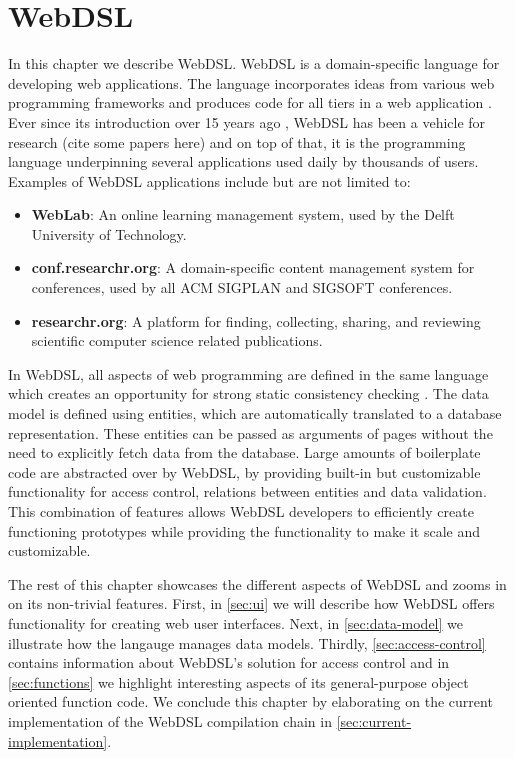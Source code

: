 
\chapter{\label{chap:webdsl}WebDSL}

  In this chapter we describe WebDSL. WebDSL is a domain-specific language for developing web applications. The language incorporates ideas from various web programming frameworks and produces code for all tiers in a web application \autocite{Groenewegen2020}. Ever since its introduction over 15 years ago \autocite{Visser2007}, WebDSL has been a vehicle for research (cite some papers here) and on top of that, it is the programming language underpinning several applications used daily by thousands of users. Examples of WebDSL applications include but are not limited to:

  \begin{itemize}
    \item \textbf{WebLab}: An online learning management system, used by the Delft University of Technology.
    \item \textbf{conf.researchr.org}: A domain-specific content management system for conferences, used by all ACM SIGPLAN and SIGSOFT conferences.
    \item \textbf{researchr.org}: A platform for finding, collecting, sharing, and reviewing scientific computer science related publications.
  \end{itemize}

  In WebDSL, all aspects of web programming are defined in the same language which creates an opportunity for strong static consistency checking \autocite{Hemel2011}. The data model is defined using entities, which are automatically translated to a database representation. These entities can be passed as arguments of pages without the need to explicitly fetch data from the database. Large amounts of boilerplate code are abstracted over by WebDSL, by providing built-in but customizable functionality for access control, relations between entities and data validation. This combination of features allows WebDSL developers to efficiently create functioning prototypes while providing the functionality to make it scale and customizable.

  The rest of this chapter showcases the different aspects of WebDSL and zooms in on its non-trivial features. First, in \cref{sec:ui} we will describe how WebDSL offers functionality for creating web user interfaces. Next, in \cref{sec:data-model} we illustrate how the langauge manages data models. Thirdly, \cref{sec:access-control} contains information about WebDSL's solution for access control and in \cref{sec:functions} we highlight interesting aspects of its general-purpose object oriented function code. We conclude this chapter by elaborating on the current implementation of the WebDSL compilation chain in \cref{sec:current-implementation}.

